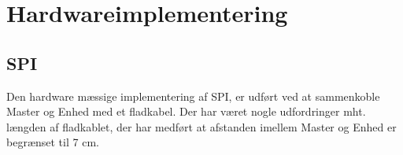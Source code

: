\section{Hardwareimplementering}
 










\subsection{SPI}

Den hardware mæssige implementering af SPI, er udført ved at sammenkoble Master og Enhed med et fladkabel. Der har været nogle udfordringer mht. længden af fladkablet, der har medført at afstanden imellem Master og Enhed er begrænset til 7 cm.